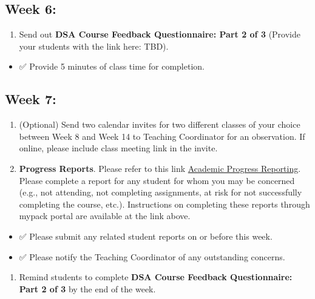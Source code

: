 \documentclass[
]{book}
\providecommand{\tightlist}{%
  \setlength{\itemsep}{0pt}\setlength{\parskip}{0pt}}
\begin{document}
\subsection{Week 6:}\label{week-6}

\begin{enumerate}
\def\labelenumi{\arabic{enumi})}
\tightlist
\item
  Send out { \textbf{DSA Course Feedback Questionnaire: Part 2 of 3} } (Provide your students with the link here: TBD).
\end{enumerate}

\begin{itemize}
\tightlist
\item
  ✅ Provide 5 minutes of class time for completion.
\end{itemize}

\subsection{Week 7:}\label{week-7}

\begin{enumerate}
\def\labelenumi{\arabic{enumi})}
\item
  (Optional) Send two calendar invites for two different classes of your choice between Week 8 and Week 14 to Teaching Coordinator for an observation. If online, please include class meeting link in the invite.
\item
  \textbf{Progress Reports}. Please refer to this link \href{https://dasa.ncsu.edu/faculty-resources/academic-progress-reporting/}{Academic Progress Reporting}. Please complete a report for any student for whom you may be concerned (e.g., not attending, not completing assignments, at risk for not successfully completing the course, etc.). Instructions on completing these reports through mypack portal are available at the link above.
\end{enumerate}

\begin{itemize}
\item
  ✅ Please submit any related student reports on or before this week.
\item
  ✅ Please notify the Teaching Coordinator of any outstanding concerns.
\end{itemize}

\begin{enumerate}
\def\labelenumi{\arabic{enumi})}
\setcounter{enumi}{2}
\tightlist
\item
  Remind students to complete \textbf{DSA Course Feedback Questionnaire: Part 2 of 3} by the end of the week.
\end{enumerate}
\end{document}
